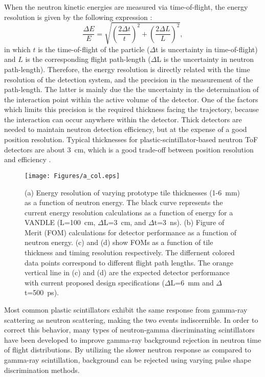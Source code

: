 \documentclass[preprint,3p,twocolumn]{elsarticle}
\begin{document}
When the neutron kinetic energies are measured via time-of-flight, the energy resolution is given by the following expression \cite{KORNILOV2009226}:
\begin{equation}
\frac{\Delta E}{E}=\sqrt{\left(\frac{2\Delta t}{t}\right )^2+\left(\frac{2\Delta L}{L}\right )^2},
\label{eq:resolution}
\end{equation}
in which $t$  is the time-of-flight of the particle ($\Delta$t is uncertainty in time-of-flight) and $L$ is the corresponding flight path-length ($\Delta$L is the uncertainty in neutron path-length). Therefore, the energy resolution is directly related with the time resolution of the detection system, and the precision in the measurement of the path-length. The latter is mainly due the the uncertainty in the determination of the interaction point within the active volume of the detector. One of the factors which limits this precision is the required thickness facing the trajectory, because the interaction can occur anywhere within the detector. Thick detectors are needed to maintain neutron detection efficiency, but at the expense of a good position resolution. Typical thicknesses for plastic-scintillator-based neutron ToF detectors are about 3~cm, which is a good trade-off between position resolution and efficiency \cite{PETERS2016122,BUTA2000412,MORRISSEY1997222}.
\begin{figure}[tp]
\centering
\texttt{[image: Figures/a\_col.eps]}
\caption{(a) Energy resolution of varying prototype tile thicknesses (1-6~mm) as a function of neutron energy. The black curve represents the current energy resolution calculations as a function of energy for a VANDLE (L=100~cm, $\Delta$L=3~cm, and $\Delta$t=3~ns). (b) Figure of Merit (FOM) calculations for detector performance as a function of neutron energy. (c) and (d) show FOMs as a function of tile thickness and timing resolution respectively. The differnent colored data points correspond to different flight path lengths. The orange vertical line in (c) and (d) are the expected detector performance with current proposed design specifications ($\Delta$L=6~mm and $\Delta$t=500~ps).}
\label{fig:resolution}
\end{figure}


Most common plastic scintillators exhibit the same response from gamma-ray scattering as neutron scattering, making the two events indiscernible. In order to correct this behavior, many types of neutron-gamma discriminating scintillators have been developed to improve gamma-ray background rejection in neutron time of flight distributions. By utilizing the slower neutron response as compared to gamma-ray scintillation, background can be rejected using varying pulse shape discrimination methods.
\end{document}
